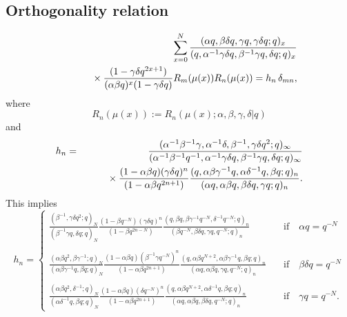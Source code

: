 \documentclass[envcountchap,graybox]{svmono}
\newcommand{\mathindent}{\hspace{7.5mm}}
\begin{document}
\subsection*{Orthogonality relation}
\begin{eqnarray}
\label{OrtqRacah}
& &\sum_{x=0}^N\frac{(\alpha q,\beta\delta q,\gamma q,\gamma\delta q;q)_x}
{(q,\alpha^{-1}\gamma\delta q,\beta^{-1}\gamma q,\delta q;q)_x}\nonumber\\
& &{}\mathindent\times
\frac{(1-\gamma\delta q^{2x+1})}{(\alpha\beta q)^x(1-\gamma\delta q)} R_m(\mu(x))R_n(\mu(x))
=h_n\,\delta_{mn},
\end{eqnarray}
where
$$R_n(\mu(x)):=R_n(\mu(x);\alpha,\beta,\gamma,\delta|q)$$
and
\begin{eqnarray*}
h_n&=&\frac{(\alpha^{-1}\beta^{-1}\gamma,\alpha^{-1}\delta,\beta^{-1},\gamma\delta q^2;q)_{\infty}}
{(\alpha^{-1}\beta^{-1}q^{-1},\alpha^{-1}\gamma\delta q,\beta^{-1}\gamma q,\delta q;q)_{\infty}}\\
& &{}\mathindent\times\frac{(1-\alpha\beta q)(\gamma\delta q)^n}{(1-\alpha\beta q^{2n+1})}
\frac{(q,\alpha\beta\gamma^{-1}q,\alpha\delta^{-1}q,\beta q;q)_n}{(\alpha q,\alpha\beta q,\beta\delta q,\gamma q;q)_n}.
\end{eqnarray*}
This implies
$$h_n=\left\{\begin{array}{ll}
\displaystyle\frac{(\beta^{-1},\gamma\delta q^2;q)_N}{(\beta^{-1}\gamma q,\delta q;q)_N}
\frac{(1-\beta q^{-N})(\gamma\delta q)^n}{(1-\beta q^{2n-N})}
\frac{(q,\beta q,\beta\gamma^{-1}q^{-N},\delta^{-1}q^{-N};q)_n}{(\beta q^{-N},\beta\delta q,\gamma q,q^{-N};q)_n}
&\quad\textrm{if}\quad\alpha q=q^{-N}\\
\\
\displaystyle\frac{(\alpha\beta q^2,\beta\gamma^{-1};q)_N}{(\alpha\beta\gamma^{-1}q,\beta q;q)_N}
\frac{(1-\alpha\beta q)(\beta^{-1}\gamma q^{-N})^n}{(1-\alpha\beta q^{2n+1})}
\frac{(q,\alpha\beta q^{N+2},\alpha\beta\gamma^{-1}q,\beta q;q)_n}{(\alpha q,\alpha\beta q,\gamma q,q^{-N};q)_n}
&\quad\textrm{if}\quad\beta\delta q=q^{-N}\\
\\
\displaystyle\frac{(\alpha\beta q^2,\delta^{-1};q)_N}{(\alpha\delta^{-1}q,\beta q;q)_N}
\frac{(1-\alpha\beta q)(\delta q^{-N})^n}{(1-\alpha\beta q^{2n+1})}
\frac{(q,\alpha\beta q^{N+2},\alpha\delta^{-1}q,\beta q;q)_n}
{(\alpha q,\alpha\beta q,\beta\delta q,q^{-N};q)_n}
&\quad\textrm{if}\quad\gamma q=q^{-N}.
\end{array}\right.$$
\end{document}
